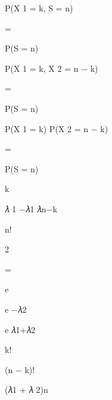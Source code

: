 \documentclass[a4paper,portrait,12pt]{article}
\begin{document}
\begin{flushleft}
P(X 1 = k, S = n)
\end{flushleft}


=


\begin{flushleft}
P(S = n)
\end{flushleft}


\begin{flushleft}
P(X 1 = k, X 2 = n $-$ k)
\end{flushleft}


=


\begin{flushleft}
P(S = n)
\end{flushleft}


\begin{flushleft}
P(X 1 = k) P(X 2 = n $-$ k)
\end{flushleft}


=


\begin{flushleft}
P(S = n)
\end{flushleft}


\begin{flushleft}
k
\end{flushleft}


\begin{flushleft}
𝜆 1 $-$𝜆1 𝜆n$-$k
\end{flushleft}


\begin{flushleft}
n!
\end{flushleft}


2


=


\begin{flushleft}
e
\end{flushleft}


\begin{flushleft}
e $-$𝜆2
\end{flushleft}


\begin{flushleft}
e 𝜆1+𝜆2
\end{flushleft}


\begin{flushleft}
k!
\end{flushleft}


\begin{flushleft}
(n $-$ k)!
\end{flushleft}


\begin{flushleft}
(𝜆1 + 𝜆 2)n
\end{flushleft}
\end{document}
